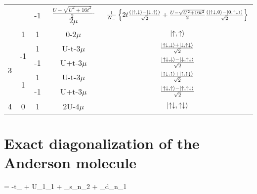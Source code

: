 \documentclass[12pt]{article}
\begin{document}
\begin{table}[htb]
\begin{center}
\begin{tabular}{@{}ccccc@{}}
                                       &                     & -1 & \(\frac{U-\sqrt{U^2+16 t^2}}{2}\)-\(2\mu\)    & \(\frac{1}{N_-}\left\{{2t \frac{(\ket{\uparrow,\downarrow}-\ket{\downarrow,\uparrow})}{\sqrt{2}} + \frac{U-\sqrt{U^2+16 t^2}}{2} \frac{(\ket{\uparrow\downarrow,0}-\ket{0,\uparrow\downarrow})}{\sqrt{2}}}\right\}\)  \\ \cmidrule(l){2-5} 
                                       & 1                   & 1  & 0-\(2\mu\)   & \(\ket{\uparrow,\uparrow}\) \\ \toprule
\multirow{4}{*}{3}                     & \multirow{2}{*}{-1} & 1  & U-t-\(3\mu\) & \(\frac{\ket{\uparrow\downarrow,\downarrow}+\ket{\downarrow,\uparrow\downarrow}}{\sqrt{2}}\) \\ \cmidrule(l){3-5} 
                                       &                     & -1 & U+t-\(3\mu\) & \(\frac{\ket{\uparrow\downarrow,\downarrow}-\ket{\downarrow,\uparrow\downarrow}}{\sqrt{2}}\) \\ \cmidrule(l){2-5}
                                       & \multirow{2}{*}{1}  & 1  & U-t-\(3\mu\) & \(\frac{\ket{\uparrow\downarrow,\uparrow}+\ket{\uparrow,\uparrow\downarrow}}{\sqrt{2}}\) \\ \cmidrule(l){3-5} 
                                       &                     & -1 & U+t-\(3\mu\) & \(\frac{\ket{\uparrow\downarrow,\uparrow}-\ket{\uparrow,\uparrow\downarrow}}{\sqrt{2}}\) \\ \toprule
4                                      & 0                   & 1  & 2U-\(4\mu\)  & \(\ket{\uparrow\downarrow,\uparrow\downarrow}\) \\
\toprule
\end{tabular}
\end{center}
\end{table}
\section{Exact diagonalization of the Anderson molecule}

\beq
\ham = -t\sum_\sigma{} + U_{1\uparrow}_{1\downarrow} + \epsilon_s\sum_\sigma\hat n_{2\sigma} + \epsilon_d\sum_\sigma\hat n_{1\sigma}
\eeq
\end{document}
